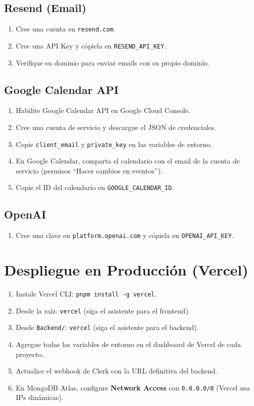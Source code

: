 \documentclass[12pt, a4paper, twoside]{report}
\begin{document}
\subsection*{Resend (Email)}
\begin{enumerate}
  \item Cree una cuenta en \texttt{resend.com}.
  \item Cree una API Key y cópiela en \texttt{RESEND\_API\_KEY}.
  \item Verifique su dominio para enviar emails con su propio dominio.
\end{enumerate}

\subsection*{Google Calendar API}
\begin{enumerate}
  \item Habilite Google Calendar API en Google Cloud Console.
  \item Cree una cuenta de servicio y descargue el JSON de credenciales.
  \item Copie \texttt{client\_email} y \texttt{private\_key} en las variables de entorno.
  \item En Google Calendar, comparta el calendario con el email de la cuenta de servicio
        (permisos ``Hacer cambios en eventos'').
  \item Copie el ID del calendario en \texttt{GOOGLE\_CALENDAR\_ID}.
\end{enumerate}

\subsection*{OpenAI}
\begin{enumerate}
  \item Cree una clave en \texttt{platform.openai.com} y cópiela en
        \texttt{OPENAI\_API\_KEY}.
\end{enumerate}

\section{Despliegue en Producción (Vercel)}

\begin{enumerate}
  \item Instale Vercel CLI: \texttt{pnpm install -g vercel}.
  \item Desde la raíz: \texttt{vercel} (siga el asistente para el frontend).
  \item Desde \texttt{Backend/}: \texttt{vercel} (siga el asistente para el backend).
  \item Agregue todas las variables de entorno en el dashboard de Vercel de cada proyecto.
  \item Actualice el webhook de Clerk con la URL definitiva del backend.
  \item En MongoDB Atlas, configure \textbf{Network Access} con \texttt{0.0.0.0/0}
        (Vercel usa IPs dinámicas).
\end{enumerate}
\end{document}
